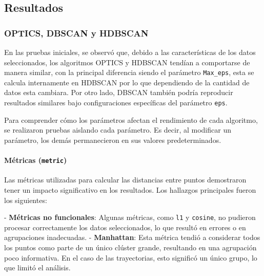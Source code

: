 \subsection{Resultados}

\subsubsection{OPTICS, DBSCAN y HDBSCAN}

En las pruebas iniciales, se observó que, debido a las características de los datos seleccionados, los algoritmos OPTICS y HDBSCAN tendían a comportarse de manera similar, con la principal diferencia siendo el parámetro \texttt{Max\_eps}, esta se calcula internamente en HDBSCAN por lo que dependiendo de la cantidad de datos esta cambiara. Por otro lado, DBSCAN también podría reproducir resultados similares bajo configuraciones específicas del parámetro \texttt{eps}. 

Para comprender cómo los parámetros afectan el rendimiento de cada algoritmo, se realizaron pruebas aislando cada parámetro. Es decir, al modificar un parámetro, los demás permanecieron en sus valores predeterminados.

\paragraph{Métricas (\texttt{metric})}

Las métricas utilizadas para calcular las distancias entre puntos demostraron tener un impacto significativo en los resultados. Los hallazgos principales fueron los siguientes:

- \textbf{Métricas no funcionales}: Algunas métricas, como \texttt{l1} y \texttt{cosine}, no pudieron procesar correctamente los datos seleccionados, lo que resultó en errores o en agrupaciones inadecuadas.
- \textbf{Manhattan}: Esta métrica tendió a considerar todos los puntos como parte de un único clúster grande, resultando en una agrupación poco informativa. En el caso de las trayectorias, esto significó un único grupo, lo que limitó el análisis.












